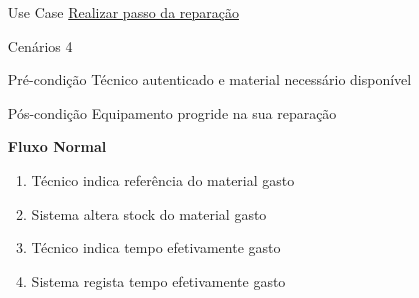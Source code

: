 \documentclass[../relatorio.tex]{subfiles}
\begin{document}
\begin{itemize}
    \item[Use Case] {\underline{Realizar passo da reparação}}
    \item[Cenários] {4}
    \item[Pré-condição] {Técnico autenticado e material necessário disponível}
    \item[Pós-condição] {Equipamento progride na sua reparação}
          \begin{flushleft}
              \textbf{Fluxo Normal}
          \end{flushleft}
          \begin{enumerate}
              \item Técnico indica referência do material gasto
              \item Sistema altera stock do material gasto
              \item Técnico indica tempo efetivamente gasto
              \item Sistema regista tempo efetivamente gasto
          \end{enumerate}

\end{itemize}
\end{document}
